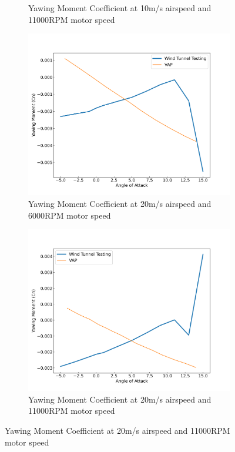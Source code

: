 \begin{figure}[H]
\begin{subfigure}[b]{0.467\textwidth}
        \caption{Yawing Moment Coefficient at 10m/s airspeed and 11000RPM motor speed}
        \label{fig:VAP_pusherr_Cn_10ms_11000}
    \end{subfigure}
    \begin{subfigure}[b]{0.467\textwidth}
        \centering
        \includegraphics[width=\textwidth]{05_Results/VAP/pusher/Cn/20ms_6000RPM_Cn.png}
        \caption{Yawing Moment Coefficient at 20m/s airspeed and 6000RPM motor speed}
        \label{fig:VAP_pusher_Cn_20ms_6000}
    \end{subfigure}
    \begin{subfigure}[b]{0.467\textwidth}
        \centering
        \includegraphics[width=\textwidth]{05_Results/VAP/pusher/Cn/20ms_11000RPM_Cn.png}
        \caption{Yawing Moment Coefficient at 20m/s airspeed and 11000RPM motor speed}
        \label{fig:VAP_pusher_Cn_20ms_11000}
    \end{subfigure}
\end{figure}


